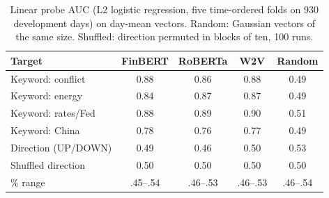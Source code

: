 \begin{table}[t]
\centering
\caption{Linear probe AUC (L2 logistic regression, five time-ordered folds on 930 development days) on day-mean vectors. Random: Gaussian vectors of the same size. Shuffled: direction permuted in blocks of ten, 100 runs.}
\label{tab:probe}
\scriptsize
\setlength{\tabcolsep}{4pt}
\begin{tabular}{lcccc}
\toprule
Target & FinBERT & RoBERTa & W2V & Random \\
\midrule
Keyword: conflict & 0.88 & 0.86 & 0.88 & 0.49 \\
Keyword: energy & 0.84 & 0.87 & 0.87 & 0.49 \\
Keyword: rates/Fed & 0.88 & 0.89 & 0.90 & 0.51 \\
Keyword: China & 0.78 & 0.76 & 0.77 & 0.49 \\
\midrule
Direction (UP/DOWN) & 0.49 & 0.46 & 0.50 & 0.53 \\
Shuffled direction & 0.50 & 0.50 & 0.50 & 0.50 \\
\quad 95\% range & .45--.54 & .46--.53 & .46--.53 & .46--.54 \\
\bottomrule
\end{tabular}
\end{table}
